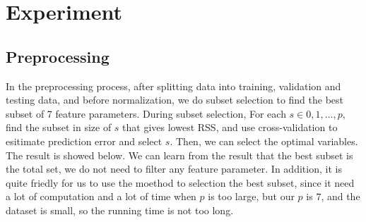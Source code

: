 \documentclass{article}
\begin{document}
\section{Experiment}
\label{headings}

\subsection{Preprocessing}

In the preprocessing process, after splitting data into training, validation and testing data, and before normalization, we do subset selection to find the best subset of 7 feature parameters. During subset selection, For each $s \in 0, 1, ... , p$, find the subset in size of $s$ that gives lowest RSS, and use cross-validation to esitimate prediction error and select $s$. Then, we can select the optimal variables. The result is showed below. We can learn from the result that the best subset is the total set, we do not need to filter any feature parameter. In addition, it is quite friedly for us to use the moethod to selection the best subset, since it need a lot of computation and a lot of time when $p$ is too large, but our $p$ is $7$, and the dataset is small, so the running time is not too long.
\begin{figure}[htbp]
\centering
{}%
%
%
\centering
\end{figure}
\end{document}
